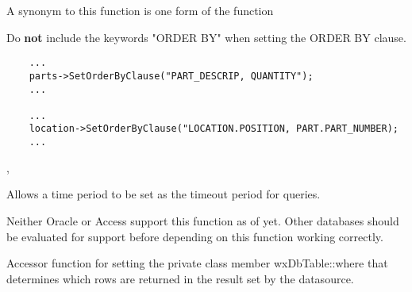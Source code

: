 A synonym to this function is one form of the function 




Do {\bf not} include the keywords "ORDER BY" when setting the ORDER BY clause.


\begin{verbatim}
    ...
    parts->SetOrderByClause("PART_DESCRIP, QUANTITY");
    ...

    ...
    location->SetOrderByClause("LOCATION.POSITION, PART.PART_NUMBER);
    ...
\end{verbatim}


, 


\label{wxdbtablesetquerytimeout}


Allows a time period to be set as the timeout period for queries.




Neither Oracle or Access support this function as of yet.  Other databases 
should be evaluated for support before depending on this function working 
correctly.


\label{wxdbtablesetwhereclause}


Accessor function for setting the private class member wxDbTable::where 
that determines which rows are returned in the result set by the datasource.

